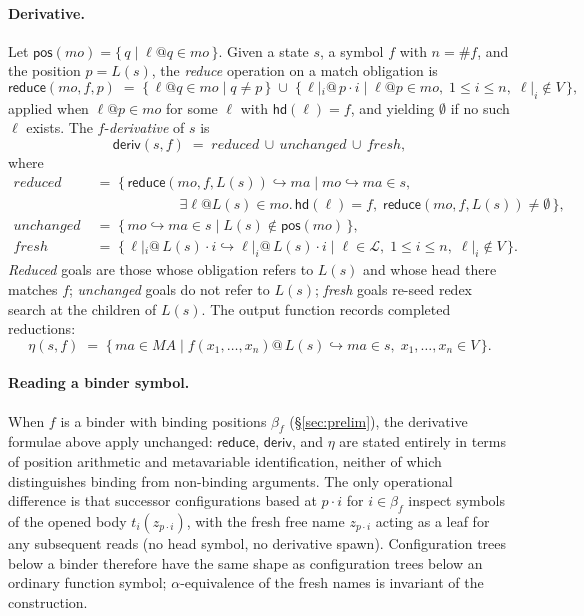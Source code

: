 \documentclass[11pt]{article}
\theoremstyle{plain}
\theoremstyle{definition}
\theoremstyle{remark}
\newcommand{\Lhs}{\mathcal{L}}
\newcommand{\hd}{\mathsf{hd}}
\newcommand{\arity}[1]{\##1}
\newcommand{\reduce}{\mathsf{reduce}}
\newcommand{\deriv}{\mathsf{deriv}}
\begin{document}
\paragraph{Derivative.}
Let $\mathsf{pos}(\mathit{mo}) = \{\, q \mid \ell@q \in \mathit{mo}
\,\}$. Given a state $s$, a symbol $f$ with $n = \arity{f}$, and the
position $p = L(s)$, the \emph{reduce} operation on a match obligation
is
\[
  \reduce(\mathit{mo}, f, p) \;=\;
  \{\, \ell @q \in \mathit{mo} \mid q \neq p \,\}
  \;\cup\;
  \{\, \ell|_{i} @\, p \cdot i \mid \ell @p \in \mathit{mo},\;
                                  1 \le i \le n,\;
                                  \ell|_{i} \notin V \,\},
\]
applied when $\ell@p \in \mathit{mo}$ for some $\ell$ with
$\hd(\ell) = f$, and yielding $\emptyset$ if no such $\ell$ exists. The
$f$-\emph{derivative} of $s$ is
\[
  \deriv(s, f) \;=\; \mathit{reduced} \,\cup\, \mathit{unchanged} \,\cup\, \mathit{fresh},
\]
where
\begin{align*}
\mathit{reduced} \;&=\; \{\, \reduce(\mathit{mo}, f, L(s)) \hookrightarrow \mathit{ma}
       \mid \mathit{mo} \hookrightarrow \mathit{ma} \in s,\\[-2pt]
       & \qquad\qquad\qquad \exists \ell @L(s) \in \mathit{mo}.\, \hd(\ell) = f,\;
            \reduce(\mathit{mo}, f, L(s)) \neq \emptyset \,\},\\
\mathit{unchanged} \;&=\; \{\, \mathit{mo} \hookrightarrow \mathit{ma} \in s
       \mid L(s) \notin \mathsf{pos}(\mathit{mo}) \,\},\\
\mathit{fresh} \;&=\; \{\, \ell|_{i} @\, L(s) \cdot i
                          \hookrightarrow \ell|_{i} @\, L(s) \cdot i
       \mid \ell \in \Lhs,\; 1 \le i \le n,\; \ell|_{i} \notin V \,\}.
\end{align*}
\emph{Reduced} goals are those whose obligation refers to $L(s)$ and
whose head there matches $f$; \emph{unchanged} goals do not refer to
$L(s)$; \emph{fresh} goals re-seed redex search at the children of
$L(s)$. The output function records completed reductions:
\[
  \eta(s, f) \;=\; \{\, \mathit{ma} \in \mathit{MA} \mid
       f(x_{1}, \ldots, x_{n}) @\, L(s) \hookrightarrow \mathit{ma} \in s,\;
       x_{1}, \ldots, x_{n} \in V \,\}.
\]

\paragraph{Reading a binder symbol.}
When $f$ is a binder with binding positions $\beta_{f}$
(\S\ref{sec:prelim}), the derivative formulae above apply unchanged:
$\reduce$, $\deriv$, and $\eta$ are stated entirely in terms of
position arithmetic and metavariable identification, neither of which
distinguishes binding from non-binding arguments. The only operational
difference is that successor configurations based at $p \cdot i$ for
$i \in \beta_{f}$ inspect symbols of the opened body
$t_{i}(z_{p \cdot i})$, with the fresh free name $z_{p \cdot i}$
acting as a leaf for any subsequent reads (no head symbol, no
derivative spawn). Configuration trees below a binder therefore have
the same shape as configuration trees below an ordinary function
symbol; $\alpha$-equivalence of the fresh names is invariant of the
construction.
\end{document}

